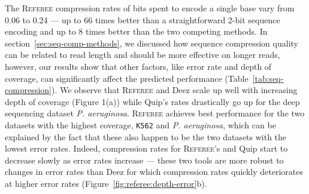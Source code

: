 \documentclass[12pt]{cmuthesis}
\newcommand{\refer}{\textsc{Referee}\xspace}
\begin{document}


  The \refer compression rates of bits spent to encode a single base vary from 0.06 to 0.24 --- up to 66 times better than a straightforward 2-bit sequence encoding and up to 8 times better than the two competing methods. In section~\ref{sec:seq-comp-methods}, we discussed how sequence compression quality can be related to read length and should be more effective on longer reads, however, our results show that other factors, like error rate and depth of coverage, can significantly affect the predicted performance (Table~\ref{tab:seq-compression}). We observe that \refer and Deez scale up well with increasing depth of coverage (Figure 1(a)) while Quip's rates drastically go up for the deep sequencing dataset \textit{P. aeruginosa}. \refer achieves best performance for the two datasets with the highest coverage, \texttt{K562} and \textit{P. aeruginosa}, which can be explained by the fact that these also happen to be the two datasets with the lowest error rates. Indeed, compression rates for \refer's and Quip start to decrease slowly as error rates increase --- these two tools are more robust to changes in error rates than Deez for which compression rates quickly deteriorates at higher error rates (Figure~\ref{fig:referee:depth-error}b).


\end{document}
